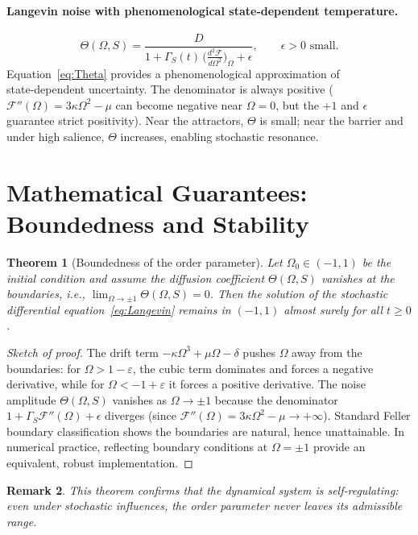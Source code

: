\documentclass[11pt]{article}
\newtheorem{theorem}{Theorem}[section]
\newtheorem{remark}[theorem]{Remark}
\begin{document}
\paragraph{Langevin noise with phenomenological state‑dependent temperature.}
\begin{equation}\label{eq:Theta}
\Theta(\Omega,S) = \frac{D}{1 + \Gamma_S(t)\,\big(\frac{d^2\mathcal{F}}{d\Omega^2}\big)_\Omega + \epsilon},
\qquad \epsilon > 0 \text{ small}.
\end{equation}
Equation~\eqref{eq:Theta} provides a phenomenological approximation of state‑dependent uncertainty. The denominator is always positive ($\mathcal{F}''(\Omega)=3\kappa\Omega^2-\mu$ can become negative near $\Omega=0$, but the $+1$ and $\epsilon$ guarantee strict positivity). Near the attractors, $\Theta$ is small; near the barrier and under high salience, $\Theta$ increases, enabling stochastic resonance.

\section{Mathematical Guarantees: Boundedness and Stability}
\begin{theorem}[Boundedness of the order parameter]\label{thm:bounded}
Let $\Omega_0\in(-1,1)$ be the initial condition and assume the diffusion coefficient $\Theta(\Omega,S)$ vanishes at the boundaries, i.e., $\lim_{\Omega\to\pm1}\Theta(\Omega,S)=0$. Then the solution of the stochastic differential equation~\eqref{eq:Langevin} remains in $(-1,1)$ almost surely for all $t\ge0$.
\end{theorem}
\begin{proof}[Sketch of proof]
The drift term $-\kappa\Omega^3+\mu\Omega-\delta$ pushes $\Omega$ away from the boundaries: for $\Omega>1-\varepsilon$, the cubic term dominates and forces a negative derivative, while for $\Omega<-1+\varepsilon$ it forces a positive derivative. The noise amplitude $\Theta(\Omega,S)$ vanishes as $\Omega\to\pm1$ because the denominator $1+\Gamma_S\mathcal{F}''(\Omega)+\epsilon$ diverges (since $\mathcal{F}''(\Omega)=3\kappa\Omega^2-\mu\to+\infty$). Standard Feller boundary classification shows the boundaries are natural, hence unattainable. In numerical practice, reflecting boundary conditions at $\Omega=\pm1$ provide an equivalent, robust implementation.
\end{proof}

\begin{remark}
This theorem confirms that the dynamical system is self‑regulating: even under stochastic influences, the order parameter never leaves its admissible range.
\end{remark}
\end{document}
